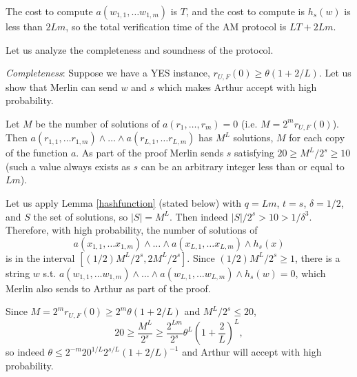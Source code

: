 The cost to compute $a(w_{1, 1}, \ldots w_{1, m})$ is $T$, and the cost to compute is $h_{s}(w)$ is less than $2Lm$, so the total verification time of the AM protocol is $LT + 2Lm$.

Let us analyze the completeness and soundness of the protocol.

\vspace{0.3 cm}

\noindent \textit{Completeness}: Suppose we have a YES instance, $r_{U, F}(0) \geq \theta (1 + 2/L)$. Let us show that Merlin can send $w$ and $s$ which makes  Arthur accept with high probability. 

Let $M$ be the number of solutions of $a(r_1, \ldots, r_m) = 0$ (i.e. $M = 2^m r_{U, F}(0)$). Then $a(r_{1, 1}, \ldots r_{1, m}) \wedge \ldots \wedge a(r_{L, 1}, \ldots r_{L, m})$ has $M^L$ solutions, $M$ for each copy of the function $a$. As part of the proof Merlin sends $s$ satisfying $20 \geq M^L/2^s \geq 10$ (such a value always exists as $s$ can be an arbitrary integer less than or equal to $Lm$).

Let us apply Lemma \ref{hashfunction} (stated below) with $q = Lm$, $t = s$, $\delta = 1/2$, and $S$ the set of solutions, so $|S| = M^L$. Then indeed $|S|/2^s > 10 > 1/\delta^3$. Therefore, with high probability, the number of solutions of
\begin{equation}
a(x_{1, 1}, \ldots x_{1, m}) \wedge \ldots \wedge a(x_{L, 1}, \ldots x_{L, m})  \wedge h_s(x) 
\end{equation}
is in the interval $[(1/2) M^L/2^s, 2  M^L/2^s]$. Since $(1/2) M^L/2^s \geq 1$, there is a string $w$ s.t. $a(w_{1, 1}, \ldots w_{1, m}) \wedge \ldots \wedge a(w_{L, 1}, \ldots w_{L, m})  \wedge h_s(w) = 0$, which Merlin also sends to Arthur as part of the proof. 


Since $M = 2^m r_{U, F}(0) \geq 2^m \theta (1 + 2/L)$ and $M^L/2^s \leq 20$,
\begin{equation}
20 \geq \frac{M^L}{2^s} \geq \frac{2^{Lm}}{2^s} \theta^L \left( 1 + \frac{2}{L} \right)^L,  
\end{equation}
so indeed $\theta \leq 2^{-m} 20^{1/L} 2^{s/L} (1+2/L)^{-1}$ and Arthur will accept with high probability. 

\vspace{0.3 cm}

